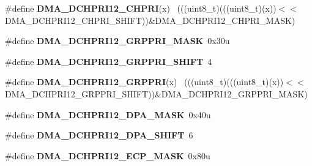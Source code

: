 \begin{DoxyCompactItemize}
\item 
\hypertarget{group___d_m_a___register___masks_gacaab01dba8700b7c4401c50e29b34a2f}{}\#define {\bfseries D\+M\+A\+\_\+\+D\+C\+H\+P\+R\+I12\+\_\+\+C\+H\+P\+R\+I}(x)                                    ~(((uint8\+\_\+t)(((uint8\+\_\+t)(x))$<$$<$D\+M\+A\+\_\+\+D\+C\+H\+P\+R\+I12\+\_\+\+C\+H\+P\+R\+I\+\_\+\+S\+H\+I\+F\+T))\&D\+M\+A\+\_\+\+D\+C\+H\+P\+R\+I12\+\_\+\+C\+H\+P\+R\+I\+\_\+\+M\+A\+S\+K)\label{group___d_m_a___register___masks_gacaab01dba8700b7c4401c50e29b34a2f}

\item 
\hypertarget{group___d_m_a___register___masks_gace455e402403bb49f3d5a49e74e73e74}{}\#define {\bfseries D\+M\+A\+\_\+\+D\+C\+H\+P\+R\+I12\+\_\+\+G\+R\+P\+P\+R\+I\+\_\+\+M\+A\+S\+K}~0x30u\label{group___d_m_a___register___masks_gace455e402403bb49f3d5a49e74e73e74}

\item 
\hypertarget{group___d_m_a___register___masks_gac8e0040db74ca4d05d58c2d1922dad2e}{}\#define {\bfseries D\+M\+A\+\_\+\+D\+C\+H\+P\+R\+I12\+\_\+\+G\+R\+P\+P\+R\+I\+\_\+\+S\+H\+I\+F\+T}~4\label{group___d_m_a___register___masks_gac8e0040db74ca4d05d58c2d1922dad2e}

\item 
\hypertarget{group___d_m_a___register___masks_ga5c47107ee120f625325e5834139d4255}{}\#define {\bfseries D\+M\+A\+\_\+\+D\+C\+H\+P\+R\+I12\+\_\+\+G\+R\+P\+P\+R\+I}(x)                                  ~(((uint8\+\_\+t)(((uint8\+\_\+t)(x))$<$$<$D\+M\+A\+\_\+\+D\+C\+H\+P\+R\+I12\+\_\+\+G\+R\+P\+P\+R\+I\+\_\+\+S\+H\+I\+F\+T))\&D\+M\+A\+\_\+\+D\+C\+H\+P\+R\+I12\+\_\+\+G\+R\+P\+P\+R\+I\+\_\+\+M\+A\+S\+K)\label{group___d_m_a___register___masks_ga5c47107ee120f625325e5834139d4255}

\item 
\hypertarget{group___d_m_a___register___masks_ga73ff6289479b47b9e3fd209fb447ef3a}{}\#define {\bfseries D\+M\+A\+\_\+\+D\+C\+H\+P\+R\+I12\+\_\+\+D\+P\+A\+\_\+\+M\+A\+S\+K}~0x40u\label{group___d_m_a___register___masks_ga73ff6289479b47b9e3fd209fb447ef3a}

\item 
\hypertarget{group___d_m_a___register___masks_ga2542343fffad88b0445eaa1d2db1e56f}{}\#define {\bfseries D\+M\+A\+\_\+\+D\+C\+H\+P\+R\+I12\+\_\+\+D\+P\+A\+\_\+\+S\+H\+I\+F\+T}~6\label{group___d_m_a___register___masks_ga2542343fffad88b0445eaa1d2db1e56f}

\item 
\hypertarget{group___d_m_a___register___masks_ga6670cd9c6c3dba8c53f330f44c6ca328}{}\#define {\bfseries D\+M\+A\+\_\+\+D\+C\+H\+P\+R\+I12\+\_\+\+E\+C\+P\+\_\+\+M\+A\+S\+K}~0x80u\label{group___d_m_a___register___masks_ga6670cd9c6c3dba8c53f330f44c6ca328}


\end{DoxyCompactItemize}
